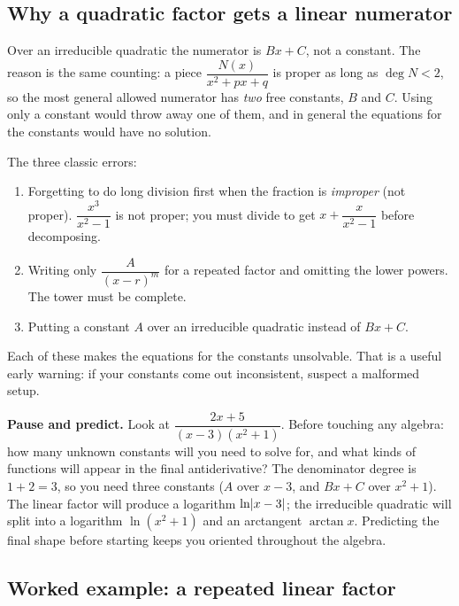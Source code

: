 \subsection{Why a quadratic factor gets a linear numerator}

Over an irreducible quadratic the numerator is $Bx + C$, not a constant.
The reason is the same counting: a piece $\dfrac{N(x)}{x^2+px+q}$ is
proper as long as $\deg N < 2$, so the most general allowed numerator has
\emph{two} free constants, $B$ and $C$. Using only a constant would throw away
one of them, and in general the equations for the constants would have no
solution.

\begin{trapbox}
The three classic errors:
\begin{enumerate}
\item Forgetting to do long division first when the fraction is
   \emph{improper} (not proper). $\dfrac{x^3}{x^2-1}$ is not proper; you must divide to get
   $x + \dfrac{x}{x^2-1}$ before decomposing.
\item Writing only $\dfrac{A}{(x-r)^m}$ for a repeated factor and omitting the
   lower powers. The tower must be complete.
\item Putting a constant $A$ over an irreducible quadratic instead of $Bx+C$.
\end{enumerate}
Each of these makes the equations for the constants unsolvable. That is a
useful early warning: if your constants come out inconsistent, suspect a
malformed setup.
\end{trapbox}

\begin{recoverybox}
\textbf{Pause and predict.} Look at $\dfrac{2x+5}{(x-3)(x^2+1)}$. Before touching any algebra:
how many unknown constants will you need to solve for, and what kinds of functions will appear
in the final antiderivative?
The denominator degree is $1 + 2 = 3$, so you need three constants ($A$ over $x-3$, and $Bx+C$
over $x^2+1$). The linear factor will produce a logarithm $\ln\lvert x-3\rvert$; the irreducible quadratic
will split into a logarithm $\ln(x^2+1)$ and an arctangent $\arctan x$. Predicting the final shape
before starting keeps you oriented throughout the algebra.
\end{recoverybox}

\subsection{Worked example: a repeated linear factor}

